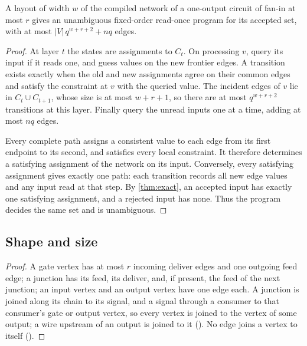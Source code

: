 \documentclass[11pt]{article}
\newcommand{\leanrefs}[1]{{\unskip\nobreak\hfil\penalty50\hskip1em\null\nobreak\hfil
  {\normalfont\small #1}\parfillskip=0pt\finalhyphendemerits=0\par}}
\newcommand{\leanref}[1]{\leanrefs{\lean{#1}}}
\theoremstyle{plain}
\theoremstyle{definition}
\theoremstyle{remark}
\newcommand{\card}[1]{\lvert #1\rvert}
\begin{document}
\begin{proposition}
\label{prop:network-program}
A layout of width $w$ of the compiled network of a one-output circuit of fan-in at most $r$
gives an unambiguous fixed-order read-once program for its accepted set, with at most
$\card V\,q^{w+r+2}+nq$ edges.
\end{proposition}

\begin{proof}
At layer $t$ the states are assignments to $C_t$. On processing $v$, query its input if it
reads one, and guess values on the new frontier edges. A transition exists exactly when the
old and new assignments agree on their common edges and satisfy the constraint at $v$ with
the queried value. The incident edges of $v$ lie in $C_t\cup C_{t+1}$, whose size is at most
$w+r+1$, so there are at most $q^{w+r+2}$ transitions at this layer. Finally query the unread
inputs one at a time, adding at most $nq$ edges.

Every complete path assigns a consistent value to each edge from its first endpoint to its
second, and satisfies every local constraint. It therefore determines a satisfying assignment
of the network on its input. Conversely, every satisfying assignment gives exactly one path:
each transition records all new edge values and any input read at that step. By
\cref{thm:exact}, an accepted input has exactly one satisfying assignment, and a rejected input
has none. Thus the program decides the same set and is unambiguous.
\end{proof}

\subsection{Shape and size}


\begin{proof}
A gate vertex has at most $r$ incoming deliver edges and one outgoing feed edge; a junction has
its feed, its deliver, and, if present, the feed of the next junction; an input vertex and an output vertex
have one edge each. A junction is joined along its chain to its signal, and a signal through a
consumer to that consumer's gate or output vertex, so every vertex is joined to the vertex of
some output; a wire upstream of an output is joined to it
(). No edge joins a vertex to itself
().
\end{proof}
\end{document}
